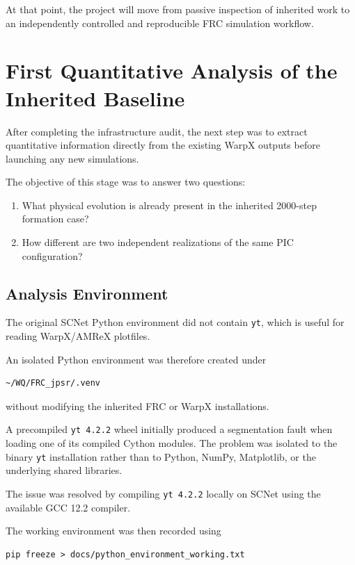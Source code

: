 \documentclass[11pt,a4paper]{article}
\begin{document}
At that point, the project will move from passive inspection of inherited work to an independently controlled and reproducible FRC simulation workflow.

\section{First Quantitative Analysis of the Inherited Baseline}

After completing the infrastructure audit, the next step was to extract
quantitative information directly from the existing WarpX outputs before
launching any new simulations.

The objective of this stage was to answer two questions:

\begin{enumerate}[label=\arabic*.]
    \item What physical evolution is already present in the inherited
    2000-step formation case?
    \item How different are two independent realizations of the same PIC
    configuration?
\end{enumerate}

\subsection{Analysis Environment}

The original SCNet Python environment did not contain \texttt{yt}, which is
useful for reading WarpX/AMReX plotfiles.

An isolated Python environment was therefore created under

\begin{lstlisting}
~/WQ/FRC_jpsr/.venv
\end{lstlisting}

without modifying the inherited FRC or WarpX installations.

A precompiled \texttt{yt 4.2.2} wheel initially produced a segmentation fault
when loading one of its compiled Cython modules. The problem was isolated to
the binary \texttt{yt} installation rather than to Python, NumPy, Matplotlib,
or the underlying shared libraries.

The issue was resolved by compiling \texttt{yt 4.2.2} locally on SCNet using
the available GCC 12.2 compiler.

The working environment was then recorded using

\begin{lstlisting}
pip freeze > docs/python_environment_working.txt
\end{lstlisting}
\end{document}

